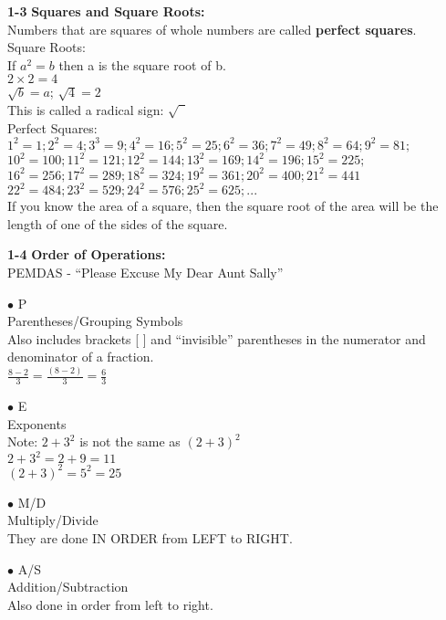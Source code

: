 \begin{enumerate*}
		\item[\Large\textbf{1-3}] \Large\textbf{Squares and Square Roots:}\\
			Numbers that are squares of whole numbers are called \textbf{perfect squares}.\\
			Square Roots:\\
			If $a^2=b$ then a is the square root of b.\\
			$2\times2=4$\\
			$\sqrt{b}=a$; $\sqrt{4}=2$\\
			This is called a radical sign: $\sqrt{\phantom{1}}$\\
			Perfect Squares:\\
			$1^2 = 1; 2^2=4; 3^3=9; 4^2=16; 5^2=25; 6^2=36; 7^2=49; 8^2=64; 9^2=81;$\\
			$10^2=100; 11^2=121; 12^2=144; 13^2=169; 14^2 = 196; 15^2=225;$\\
			$16^2=256; 17^2=289; 18^2=324; 19^2=361; 20^2=400; 21^2=441$\\
			$22^2=484; 23^2=529; 24^2=576; 25^2=625; ...$\\
			If you know the area of a square, then the square root of the area will be the length of one of the sides of the square.\\
			
		\item[\Large\textbf{1-4}] \Large\textbf{Order of Operations:}\\
			PEMDAS - ``Please Excuse My Dear Aunt Sally''			
			\begin{enumerate*}
			\item[$\bullet$]P\\
				Parentheses/Grouping Symbols\\
				Also includes brackets [ ] and ``invisible'' parentheses in the numerator and denominator of a fraction.\\
				$\frac{8-2}{3}=\frac{(8-2)}{3}=\frac{6}{3}$\\
			\item[$\bullet$]E\\
				Exponents\\
				Note: $2+3^2$ is not the same as $(2+3)^2$\\
				$2+3^2=2+9=11$\\
				$(2+3)^2=5^2=25$\\
			\item[$\bullet$]M/D\\
				Multiply/Divide\\
				They are done IN ORDER from LEFT to RIGHT.\\
			\item[$\bullet$]A/S\\
				Addition/Subtraction\\
				Also done in order from left to right.\\
			\end{enumerate*}			


\end{enumerate*}
